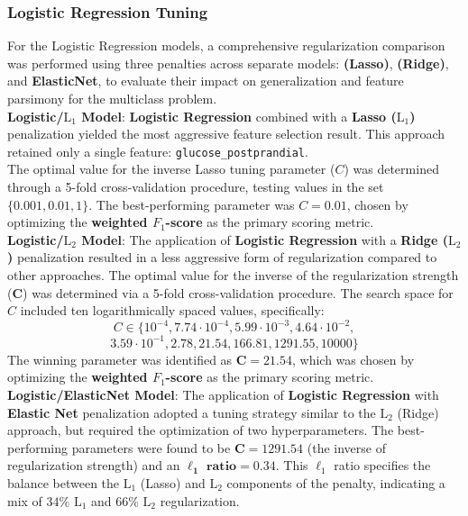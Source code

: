 \documentclass[conference]{IEEEtran}
\begin{document}
\subsubsection{\textbf{Logistic Regression Tuning}}
For the Logistic Regression models, a comprehensive regularization comparison was performed using three penalties across separate models: \textbf{ (Lasso)}, \textbf{ (Ridge)}, and \textbf{ElasticNet}, to evaluate their impact on generalization and feature parsimony for the multiclass problem.\\
\indent \textbf{Logistic/$\text{L}_1$ Model}: \textbf{Logistic Regression} combined with a \textbf{Lasso ($\text{L}_1$)} penalization yielded the most aggressive feature selection result. This approach retained only a single feature: \texttt{glucose\_postprandial}. \\
\indent The optimal value for the inverse Lasso tuning parameter ($C$) was determined through a 5-fold cross-validation procedure, testing values in the set $\{0.001, 0.01, 1\}$. The best-performing parameter was $C = 0.01$, chosen by optimizing the \textbf{weighted  $F_1$-score} as the primary scoring metric.\\
\indent \textbf{Logistic/$\text{L}_2$ Model}: The application of \textbf{Logistic Regression} with a \textbf{Ridge ($\text{L}_2$)} penalization resulted in a less aggressive form of regularization compared to other approaches. The optimal value for the inverse of the regularization strength ($\mathbf{C}$) was determined via a 5-fold cross-validation procedure. The search space for $C$ included ten logarithmically spaced values, specifically:
$$
C \in \{10^{-4}, 7.74 \cdot 10^{-4}, 5.99 \cdot 10^{-3}, 4.64 \cdot 10^{-2},$$
$$ 3.59 \cdot 10^{-1}, 2.78, 21.54, 166.81, 1291.55, 10000\}
$$
\indent The winning parameter was identified as $\mathbf{C = 21.54}$, which was chosen by optimizing the \textbf{weighted  $F_1$-score} as the primary scoring metric.\\
\indent \textbf{Logistic/ElasticNet Model}: The application of \textbf{Logistic Regression} with \textbf{Elastic Net} penalization adopted a tuning strategy similar to the $\text{L}_2$ (Ridge) approach, but required the optimization of two hyperparameters. The best-performing parameters were found to be $\mathbf{C = 1291.54}$ (the inverse of regularization strength) and an $\mathbf{\ell_1 \text{ ratio} = 0.34}$. This $\ell_1$ ratio specifies the balance between the $\text{L}_1$ (Lasso) and $\text{L}_2$ components of the penalty, indicating a mix of $34\%$ $\text{L}_1$ and $66\%$ $\text{L}_2$ regularization.\\
\end{document}

